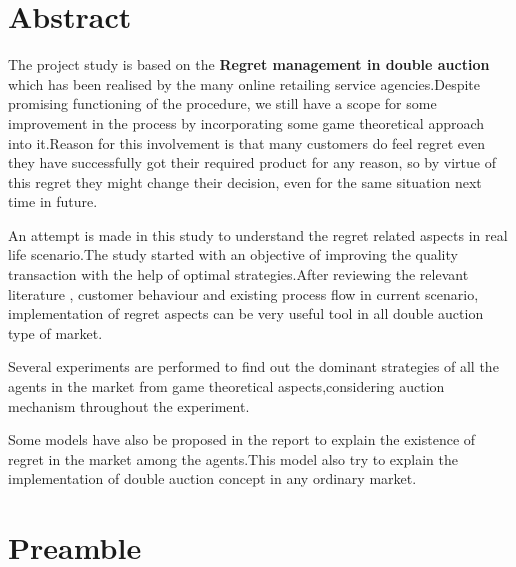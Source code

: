\documentclass[10pt,a4paper,oneside]{report}
\begin{document}
\chapter*{Abstract}
The project study is based on the \textbf{Regret management in double auction} which has been realised by the many online retailing service agencies.Despite promising functioning of the procedure, we still have a scope for some improvement in the process by incorporating some game theoretical approach into it.Reason for this involvement is that many customers do feel regret even they have successfully got their required product for any reason, so by virtue of this regret they might change their decision, even for the same situation next time in future.\vspace{6mm}

\noindent An attempt is made in this study to understand the regret related aspects in real life scenario.The study started with an objective of improving the quality transaction with the help of optimal strategies.After reviewing the relevant literature , customer behaviour and existing process flow in current scenario, implementation of regret aspects can be very useful tool in all double auction type of market.\vspace{6mm}

\noindent Several experiments are performed to find out the dominant strategies of all the agents in the market from game theoretical aspects,considering auction mechanism throughout the experiment.\vspace{6mm}

\noindent Some models have also be proposed in the report to explain the existence of regret in the market among the agents.This model also try to explain the implementation of double auction concept in any ordinary market.
\tableofcontents
\listoffigures
\listoftables
\chapter{Preamble}
\end{document}
